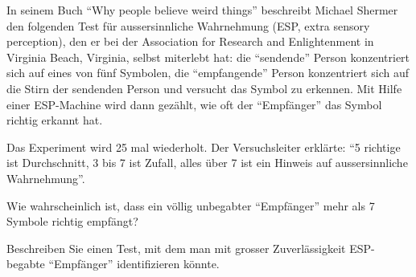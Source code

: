 In seinem Buch ``Why people believe weird things'' beschreibt Michael
Shermer den folgenden Test für aussersinnliche Wahrnehmung
(ESP, extra sensory perception), den er bei der Association for Research and Enlightenment in Virginia Beach, Virginia, selbst miterlebt hat:
die ``sendende'' Person konzentriert sich
auf eines von fünf Symbolen, die ``empfangende'' Person konzentriert sich 
auf die Stirn der sendenden Person und versucht das Symbol zu erkennen.
Mit Hilfe einer ESP-Machine wird dann gezählt, wie oft der ``Empfänger''
das Symbol richtig erkannt hat.
\begin{center}
\end{center}
Das Experiment wird 25 mal wiederholt. Der Versuchsleiter erklärte:
``5 richtige ist Durchschnitt, 3 bis 7 ist Zufall,
alles über 7 ist ein Hinweis auf aussersinnliche Wahrnehmung''.
\begin{teilaufgaben}
\item Wie wahrscheinlich ist, dass ein völlig unbegabter ``Empfänger''
mehr als 7 Symbole richtig empfängt?
\item Beschreiben Sie einen Test, mit dem man mit grosser Zuverlässigkeit
ESP-begabte ``Empfänger'' identifizieren könnte.
\end{teilaufgaben}


